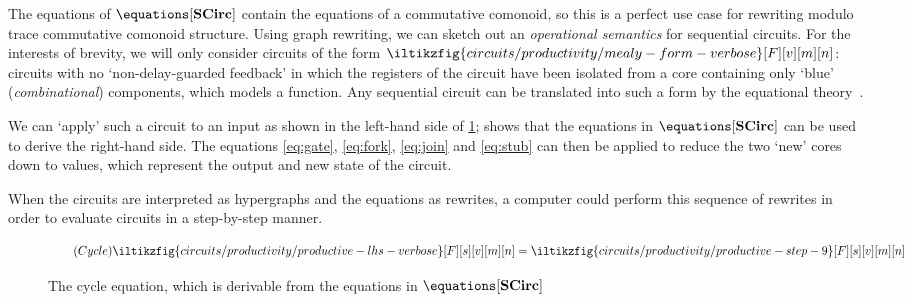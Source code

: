 The equations of \(\equations[\mathbf{SCirc}]\) contain the equations of a
commutative comonoid, so this is a perfect use case for rewriting modulo
trace commutative comonoid structure.
Using graph rewriting, we can sketch out an \emph{operational semantics} for
sequential circuits.
For the interests of brevity, we will only consider circuits of the form \(
    \iltikzfig{circuits/productivity/mealy-form-verbose}[F][v][m][n]
\): circuits with no `non-delay-guarded feedback' in which the registers of the
circuit have been isolated from a core containing only `blue'
(\emph{combinational}) components, which models a function.
Any sequential circuit can be translated into such a form by the equational
theory~\cite[Sec. VI]{ghica2022compositional}.

We can `apply' such a circuit to an input as shown in the left-hand side of
\cref{fig:cycle}; \cite[Thm. 104]{ghica2022compositional} shows that the
equations in \(\equations[\mathbf{SCirc}]\) can be used to derive the right-hand
side.
The equations \eqref{eq:gate}, \eqref{eq:fork}, \eqref{eq:join} and
\eqref{eq:stub} can then be applied to reduce the two `new' cores down to
values, which represent the output and new state of the circuit.

When the circuits are interpreted as hypergraphs and the equations as rewrites,
a computer could perform this sequence of rewrites in order to evaluate circuits
in a step-by-step manner.

\begin{figure*}
    \centering
    \begin{equation*}
        \tag{\(\mathsf{Cycle}\)}
        \iltikzfig{circuits/productivity/productive-lhs-verbose}[F][s][v][m][n]
        =
        \iltikzfig{circuits/productivity/productive-step-9}[F][s][v][m][n]
        \label{eq:cycle}
    \end{equation*}
    \caption{
        The cycle equation, which is derivable from the equations in
        \(\equations[\mathbf{SCirc}]\)
    }
    \label{fig:cycle}
\end{figure*}
